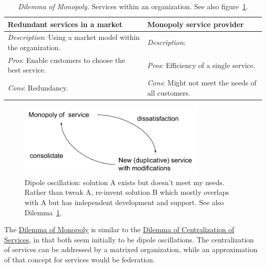 \begin{center}
\begin{table}[H] %
\begin{tabular}{ | m{\dilemmatablewidth}| m{\dilemmatablewidth} | } 
  \hline
  \textbf{Redundant services in a market} &
  \textbf{Monopoly service provider} \\
  \hline
  \textit{Description}: Using a market model within the organization. &
  \textit{Description}:  \\  
  \hline
  \textit{Pros}: Enable customers to choose the best service. &
  \textit{Pros}: Efficiency of a single service. \\
  \hline
  \textit{Cons}: Redundancy. & 
  \textit{Cons}: Might not meet the needs of all customers. \\
  \hline
\end{tabular}
\caption{
\textit{Dilemma of Monopoly.}
Services within an organization. See also figure~\ref{fig:market-vs-monopoly}.
}
\label{table:market-vs-monopoly}
\end{table}
\end{center}


\begin{figure}[H] %
    \centering
    \includegraphics[width=0.8\textwidth]{images/dilemma_market_vs_monopoly.pdf}
    \caption{Dipole oscillation: solution A exists but doesn't meet my needs. Rather than tweak A, re-invent solution B which mostly overlaps with A but has independent development and support. See also Dilemma~\ref{table:market-vs-monopoly}.}
    \label{fig:market-vs-monopoly}
\end{figure}

The \hyperref[table:market-vs-monopoly]{Dilemma of Monopoly} is similar to the \hyperref[table:central-vs-distributed]{Dilemma of Centralization of Services}, in that both seem initially to be dipole oscillations. The centralization of services can be addressed by a matrixed organization, while an approximation of that concept for services would be federation. 

